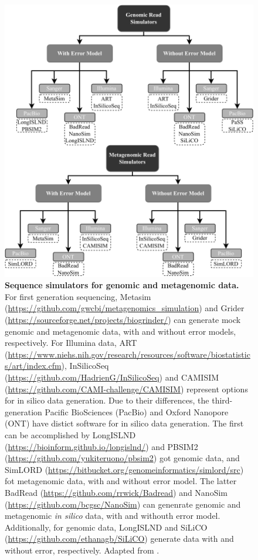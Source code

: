 \begin{figure}[h!]
\centering
\includegraphics[width=\textwidth]{figures/introduction/Figure 7.pdf}
\caption{\textbf{Sequence simulators for genomic and metagenomic data.} For first generation sequencing, Metasim (\url{https://github.com/gwcbi/metagenomics_simulation}) and Grider (\url{https://sourceforge.net/projects/biogrinder/}) can generate mock genomic and metagenomic data, with and without error models, respectively. For Illumina data, ART (\url{https://www.niehs.nih.gov/research/resources/software/biostatistics/art/index.cfm}), InSilicoSeq (\url{https://github.com/HadrienG/InSilicoSeq}) and CAMISIM (\url{https://github.com/CAMI-challenge/CAMISIM}) represent options for in silico data generation. Due to their differences, the third-generation Pacific BioSciences (PacBio) and Oxford Nanopore (ONT) have distict software for in silico data generation. The first can be accomplished by LongISLND (\url{https://bioinform.github.io/longislnd/}) and PBSIM2 (\url{https://github.com/yukiteruono/pbsim2}) got genomic data, and SimLORD (\url{https://bitbucket.org/genomeinformatics/simlord/src}) fot metagenomic data, with and without error model. The latter BadRead (\url{https://github.com/rrwick/Badread}) and NanoSim (\url{https://github.com/bcgsc/NanoSim}) can genenrate genomic and metagenomic \textit{in silico} data, with and withouth error model. Additionally, for genomic data, LongISLND and SiLiCO (\url{https://github.com/ethanagb/SiLiCO}) generate data with and without error, respectively. Adapted from \cite{escalona_comparison_2016}.}
\label{fig:figure7}
\end{figure}

